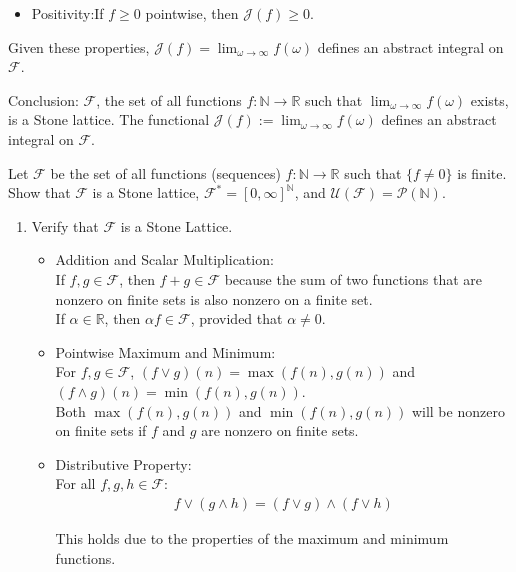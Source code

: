 \documentclass{report}
\begin{document}
{\begin{myproof}
\begin{enumerate}
\begin{itemize}
\item Positivity:If \(f \geq 0\) pointwise, then \(\mathcal{J}(f) \geq 0\).
\end{itemize}
Given these properties, \(\mathcal{J}(f) = \lim_{\omega \to \infty} f(\omega)\) defines an abstract integral on \(\mathcal{F}\).
\end{enumerate}
Conclusion:
\(\mathcal{F}\), the set of all functions \(f : \mathbb{N} \to \mathbb{R}\) such that \(\lim_{\omega \to \infty} f(\omega)\) exists, is a Stone lattice. The functional \(\mathcal{J}(f) := \lim_{\omega \to \infty} f(\omega)\) defines an abstract integral on \(\mathcal{F}\).
\end{myproof}
\ex{}
{
Let \(\mathcal{F}\) be the set of all functions (sequences) \(f : \mathbb{N} \to \mathbb{R}\) such that \(\{f \neq 0\}\) is finite. Show that \(\mathcal{F}\) is a Stone lattice, \(\mathcal{F}^* = [0, \infty]^\mathbb{N}\), and \(\mathcal{U}(\mathcal{F}) = \mathcal{P}(\mathbb{N})\).
}
\begin{myproof}
    \begin{enumerate}
        \item Verify that \(\mathcal{F}\) is a Stone Lattice.
        \begin{itemize}
            \item Addition and Scalar Multiplication:\\
            If \(f, g \in \mathcal{F}\), then \(f + g \in \mathcal{F}\) because the sum of two functions that are nonzero on finite sets is also nonzero on a finite set.\\
            If \(\alpha \in \mathbb{R}\), then \(\alpha f \in \mathcal{F}\), provided that \(\alpha \neq 0\).
            \item Pointwise Maximum and Minimum:\\
     For \(f, g \in \mathcal{F}\), \((f \vee g)(n) = \max(f(n), g(n))\) and \((f \wedge g)(n) = \min(f(n), g(n))\).\\
     Both \(\max(f(n), g(n))\) and \(\min(f(n), g(n))\) will be nonzero on finite sets if \(f\) and \(g\) are nonzero on finite sets.
\item Distributive Property:\\
   For all \(f, g, h \in \mathcal{F}\):
     \begin{align*}
         f \vee (g \wedge h) = (f \vee g) \wedge (f \vee h)
     \end{align*}
    
     This holds due to the properties of the maximum and minimum functions.


\end{itemize}
\end{enumerate}
\end{myproof}}
\end{document}
